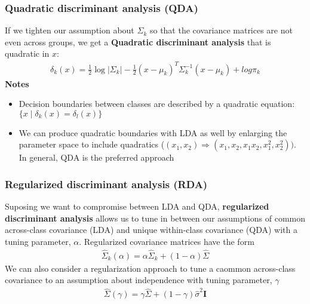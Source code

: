 \documentclass{article}
\newcommand{\abs}[1]{\lvert#1\rvert}
\begin{document}
\subsubsection{Quadratic discriminant analysis (QDA)}
If we tighten our assumption about $\Sigma_k$ so that the covariance matrices are not even across groups, we get a \textbf{Quadratic discriminant analysis} that is quadratic in $x$:
\begin{align*}
  \delta_k(x) = \frac{1}{2}\log\abs{\Sigma_k} - \frac{1}{2}(x - \mu_k)^T\Sigma_k^{-1}(x - \mu_k) + log\pi_k
\end{align*}
\textbf{Notes}
\begin{itemize}
  \item Decision boundaries between classes are described by a quadratic equation: $\{x \mid \delta_k(x) = \delta_l(x) \}$
  \item We can produce quadratic boundaries with LDA as well by enlarging the parameter space to include quadratics ($(x_1, x_2) \Longrightarrow (x_1, x_2, x_1x_2, x_1^2, x_2^2))$. In general, QDA is the preferred approach
\end{itemize}

\subsubsection{Regularized discriminant analysis (RDA)}
Suposing we want to compromise between LDA and QDA, \textbf{regularized discriminant analysis} allows us to tune in between our assumptions of common across-class covariance (LDA) and unique within-class covariance (QDA) with a tuning parameter, $\alpha$. Regularized covariance matrices have the form
\begin{align*}
  \hat{\Sigma}_k(\alpha) = \alpha\hat{\Sigma}_k + (1 - \alpha)\hat{\Sigma}
\end{align*}
We can also consider a regularization approach to tune a caommon across-class covariance to an assumption about independence with tuning parameter, $\gamma$
\begin{align*}
  \hat{\Sigma}(\gamma) = \gamma\hat{\Sigma} + (1 - \gamma)\hat{\sigma}^2\mathbf{I} 
\end{align*}
\end{document}
